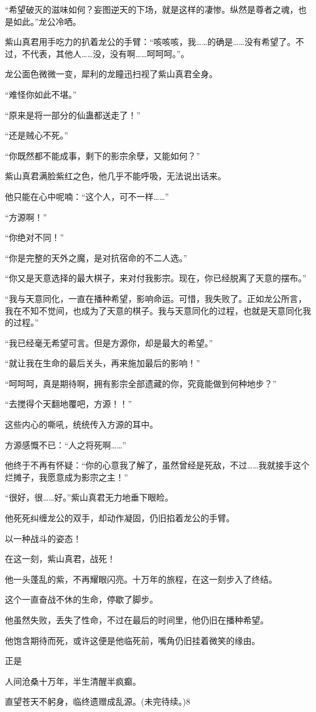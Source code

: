 \begin{this_body}
“希望破灭的滋味如何？妄图逆天的下场，就是这样的凄惨。纵然是尊者之魂，也是如此。”龙公冷哂。

紫山真君用手吃力的扒着龙公的手臂：“咳咳咳，我……的确是……没有希望了。不过，不代表，其他人……没，没有啊……呵呵呵。”。

龙公面色微微一变，犀利的龙瞳迅扫视了紫山真君全身。

“难怪你如此不堪。”

“原来是将一部分的仙蛊都送走了！”

“还是贼心不死。”

“你既然都不能成事，剩下的影宗余孽，又能如何？”

紫山真君满脸紫红之色，他几乎不能呼吸，无法说出话来。

他只能在心中呢喃：“这个人，可不一样……”

“方源啊！”

“你绝对不同！”

“你是完整的天外之魔，是对抗宿命的不二人选。”

“你又是天意选择的最大棋子，来对付我影宗。现在，你已经脱离了天意的摆布。”

“我与天意同化，一直在播种希望，影响命运。可惜，我失败了。正如龙公所言，我在不知不觉间，也成为了天意的棋子。我与天意同化的过程，也就是天意同化我的过程。”

“我已经毫无希望可言。但是方源你，却是最大的希望。”

“就让我在生命的最后关头，再来施加最后的影响！”

“呵呵呵，真是期待啊，拥有影宗全部遗藏的你，究竟能做到何种地步？”

“去搅得个天翻地覆吧，方源！！”

这些内心的嘶吼，统统传入方源的耳中。

方源感慨不已：“人之将死啊……”

他终于不再有怀疑：“你的心意我了解了，虽然曾经是死敌，不过……我就接手这个烂摊子，我愿意成为影宗之主！”

“很好，很……好。”紫山真君无力地垂下眼睑。

他死死纠缠龙公的双手，却动作凝固，仍旧掐着龙公的手臂。

以一种战斗的姿态！

在这一刻，紫山真君，战死！

他一头蓬乱的紫，不再耀眼闪亮。十万年的旅程，在这一刻步入了终结。

这个一直奋战不休的生命，停歇了脚步。

他虽然失败，丢失了性命，不过在最后的时间里，他仍旧在播种希望。

他饱含期待而死，或许这便是他临死前，嘴角仍旧挂着微笑的缘由。

正是

人间沧桑十万年，半生清醒半疯癫。

直望苍天不躬身，临终遗赠成乱源。(未完待续。)8

\end{this_body}

